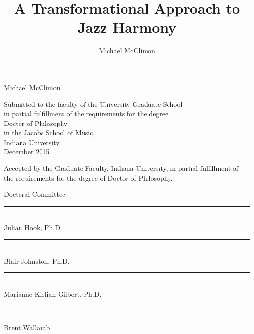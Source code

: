 
\title{A Transformational Approach to Jazz Harmony}
\author{Michael McClimon}
\date{}
\makeatletter \let\Title\@title \makeatother


\begin{center}
  \singlespacing
  \thispagestyle{empty}

  \vspace*{\fill}
  \keepthetitle
  {
    \MakeUppercase{\Title}
  }

  \vspace{\baselineskip}
  Michael McClimon

  \vspace{4\baselineskip}

  Submitted to the faculty of the University Graduate School \\
  in partial fulfillment of the requirements for the degree \\
  Doctor of Philosophy \\
  in the Jacobs School of Music, \\
  Indiana University \\
  December 2015

  \vspace{\fill}
\end{center}
\clearpage

\singlespacing
\begin{center}
  Accepted by the Graduate Faculty, Indiana University, in partial fulfillment
  of the requirements for the degree of Doctor of Philosophy.
\end{center}

{\flushleft
  \vspace{\baselineskip}
  Doctoral Committee
}

{\flushright

\vspace{5em}
\rule{20em}{0.5pt} \\ Julian Hook, Ph.D.

\vspace{5em}
\rule{20em}{0.5pt} \\ Blair Johnston, Ph.D.

\vspace{5em}
\rule{20em}{0.5pt} \\ Marianne Kielian-Gilbert, Ph.D.

\vspace{5em}
\rule{20em}{0.5pt} \\ Brent Wallarab

}



